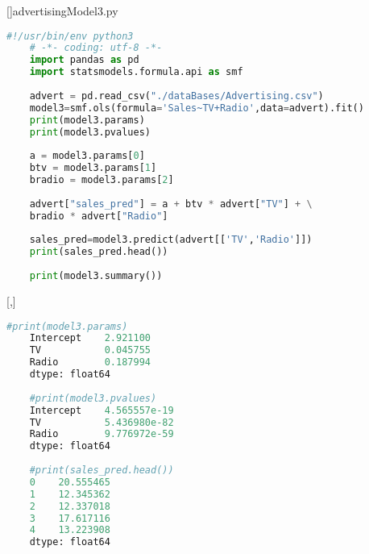 []{advertisingModel3.py} 
\begin{lstlisting}[language=Python]
	#!/usr/bin/env python3
	# -*- coding: utf-8 -*-
	import pandas as pd
	import statsmodels.formula.api as smf
	
	advert = pd.read_csv("./dataBases/Advertising.csv")
	model3=smf.ols(formula='Sales~TV+Radio',data=advert).fit()
	print(model3.params)
	print(model3.pvalues)
	
	a = model3.params[0]
	btv = model3.params[1]
	bradio = model3.params[2]
	
	advert["sales_pred"] = a + btv * advert["TV"] + \
	bradio * advert["Radio"]
	
	sales_pred=model3.predict(advert[['TV','Radio']])
	print(sales_pred.head())
	
	print(model3.summary())
\end{lstlisting}


[,]{}
\begin{lstlisting}[language=Python]
	#print(model3.params)
	Intercept    2.921100
	TV           0.045755
	Radio        0.187994
	dtype: float64
	
	#print(model3.pvalues)
	Intercept    4.565557e-19
	TV           5.436980e-82
	Radio        9.776972e-59
	dtype: float64
	
	#print(sales_pred.head())
	0    20.555465
	1    12.345362
	2    12.337018
	3    17.617116
	4    13.223908
	dtype: float64
\end{lstlisting}

